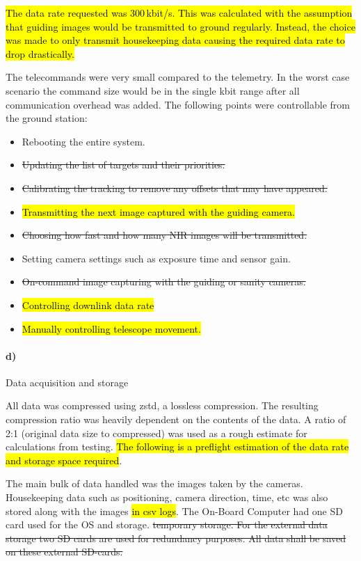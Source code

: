 \hl{The data rate requested was 300\,kbit/s. This was calculated with the assumption that guiding images would be transmitted to ground regularly. Instead, the choice was made to only transmit housekeeping data causing the required data rate to drop drastically.}

The telecommands were very small compared to the telemetry. In the worst case scenario the command size would be in the single kbit range after all communication overhead was added. The following points were controllable from the ground station:

\begin{itemize}
    \item Rebooting the entire system.
    \item \st{Updating the list of targets and their priorities.}
    \item \st{Calibrating the tracking to remove any offsets that may have appeared.}
    \item \hl{Transmitting the next image captured with the guiding camera.}
    \item \st{Choosing how fast and how many NIR images will be transmitted.}
    \item Setting camera settings such as exposure time and sensor gain.
    \item \st{On-command image capturing with the guiding or sanity cameras.}
    \item \hl{Controlling downlink data rate}
    \item \hl{Manually controlling telescope movement.}
\end{itemize}

\paragraph{d)} Data acquisition and storage

All data was compressed using zstd, a lossless compression. The resulting compression ratio was heavily dependent on the contents of the data. A ratio of 2:1 (original data size to compressed) was used as a rough estimate for calculations from testing. \hl{The following is a preflight estimation of the data rate and storage space required}.

The main bulk of data handled was the images taken by the cameras. Housekeeping data such as positioning, camera direction, time, etc was also stored along with the images \hl{in csv logs}. The On-Board Computer had one SD card used for the OS and storage. \st{temporary storage. For the external data storage two SD cards are used for redundancy purposes. All data shall be saved on these external SD-cards.}

